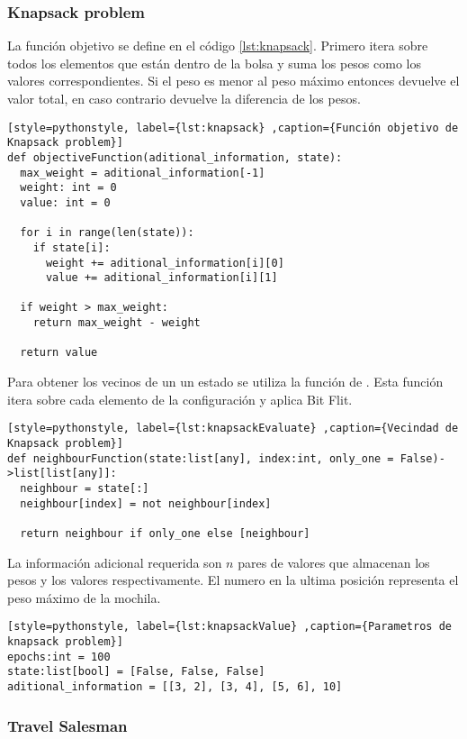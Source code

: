 \documentclass[12pt,twoside]{article}
\begin{document}
\clearpage
\subsubsection{Knapsack problem}

La función objetivo se define en el código \ref{lst:knapsack}. Primero itera sobre todos los elementos que están dentro de la bolsa y suma los pesos como los valores correspondientes. Si el peso es menor al peso máximo entonces devuelve el valor total, en caso contrario devuelve la diferencia de los pesos.

\begin{lstlisting}[style=pythonstyle, label={lst:knapsack} ,caption={Función objetivo de Knapsack problem}]
def objectiveFunction(aditional_information, state):
  max_weight = aditional_information[-1]
  weight: int = 0
  value: int = 0

  for i in range(len(state)):
    if state[i]:
      weight += aditional_information[i][0]
      value += aditional_information[i][1]

  if weight > max_weight:
    return max_weight - weight
    
  return value
\end{lstlisting}

Para obtener los vecinos de un un estado se utiliza la función de \cite{lst:knapsackEvaluate}. Esta función itera sobre cada elemento de la configuración y aplica Bit Flit.

\begin{lstlisting}[style=pythonstyle, label={lst:knapsackEvaluate} ,caption={Vecindad de Knapsack problem}]
def neighbourFunction(state:list[any], index:int, only_one = False)->list[list[any]]:
  neighbour = state[:]
  neighbour[index] = not neighbour[index]

  return neighbour if only_one else [neighbour]
\end{lstlisting}

La información adicional requerida son $n$ pares de valores que almacenan los pesos y los valores respectivamente. El numero en la ultima posición representa el peso máximo de la mochila.

\begin{lstlisting}[style=pythonstyle, label={lst:knapsackValue} ,caption={Parametros de knapsack problem}]
epochs:int = 100
state:list[bool] = [False, False, False]
aditional_information = [[3, 2], [3, 4], [5, 6], 10]
\end{lstlisting}

\clearpage
\subsubsection{Travel Salesman}
\end{document}
